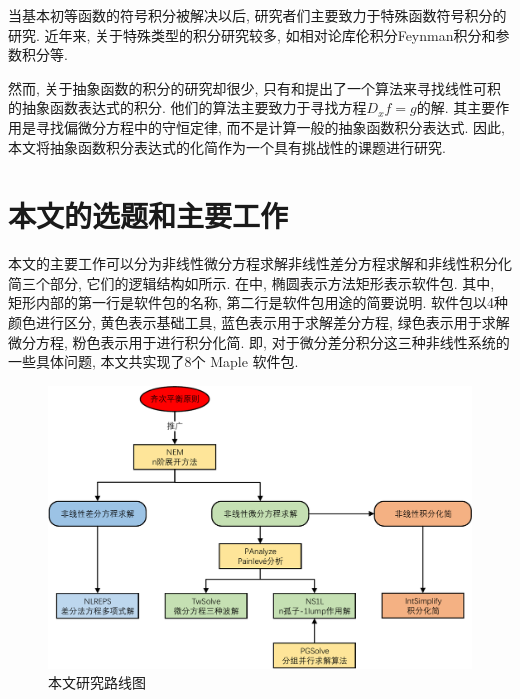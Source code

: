 当基本初等函数的符号积分被解决以后, 研究者们主要致力于特殊函数符号积分的研究\cite{cherry1985,cherry1986,bertrand1994,jeffrey1997}. 近年来, 关于特殊类型的积分研究较多, 如相对论库伦积分\cite{paule2012,paule2013}\D Feynman积分\cite{blumlein2012,smirnov2015}和参数积分\cite{raab2016}等.

然而, 关于抽象函数的积分的研究却很少, 只有和提出了一个算法来寻找线性可积的抽象函数表达式的积分. 他们的算法主要致力于寻找方程$D_x f=g$的解. 其主要作用是寻找偏微分方程中的守恒定律\cite{poole2011}, 而不是计算一般的抽象函数积分表达式. 因此, 本文将抽象函数积分表达式的化简作为一个具有挑战性的课题进行研究.

\section{本文的选题和主要工作}
本文的主要工作可以分为非线性微分方程求解\D 非线性差分方程求解和非线性积分化简三个部分, 它们的逻辑结构如所示. 在中, 椭圆表示方法\D 矩形表示软件包. 其中, 矩形内部的第一行是软件包的名称, 第二行是软件包用途的简要说明. 软件包以4种颜色进行区分, 黄色表示基础工具, 蓝色表示用于求解差分方程, 绿色表示用于求解微分方程, 粉色表示用于进行积分化简. 即, 对于微分\D 差分\D 积分这三种非线性系统的一些具体问题, 本文共实现了8个 Maple 软件包.

\begin{figure}[htbp]
\includegraphics[width=\textwidth]{fig/research.pdf}
\caption{本文研究路线图}\label{outline}
\end{figure}

